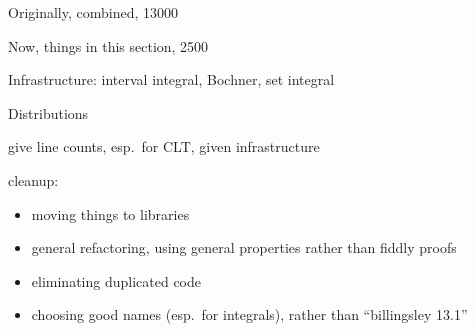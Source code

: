 \documentclass{svjour3}
\newcommand{\todo}[1]{{\color{red}#1}}
\begin{document}
\todo{
Originally, combined, 13000

Now, things in this section, 2500

Infrastructure: interval integral, Bochner, set integral

Distributions

give line counts, esp.~for CLT, given infrastructure


cleanup:
\begin{itemize}
 \item moving things to libraries
 \item general refactoring, using general properties rather than fiddly proofs
 \item eliminating duplicated code
 \item choosing good names (esp.~for integrals), rather than ``billingsley 13.1''
\end{itemize}
}



\end{document}
